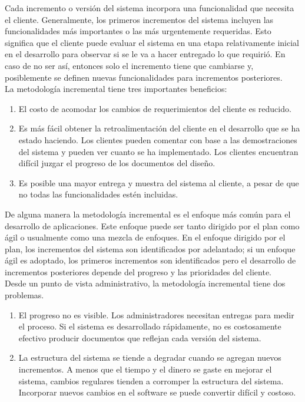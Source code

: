\documentclass[12pt]{report}
\begin{document}
Cada incremento o versión del sistema incorpora una funcionalidad que necesita el cliente. Generalmente, los primeros incrementos del sistema incluyen las funcionalidades más importantes o las más urgentemente requeridas. Esto significa que el cliente puede evaluar el sistema en una etapa relativamente inicial en el desarrollo para observar si se le va a hacer entregado lo que requirió. En caso de no ser así, entonces solo el incremento tiene que cambiarse y, posiblemente se definen nuevas funcionalidades para incrementos posteriores.\\

La metodología incremental tiene tres importantes beneficios:
\begin{enumerate}
\item El costo de acomodar los cambios de requerimientos del cliente es reducido.
\item  Es más fácil obtener la retroalimentación del cliente en el desarrollo que se ha estado haciendo. Los clientes pueden comentar con base a las demostraciones del sistema y pueden ver cuanto se ha implementado. Los clientes encuentran difícil juzgar el progreso de los documentos del diseño.
\item Es posible una mayor entrega y muestra del sistema al cliente, a pesar de que no todas las funcionalidades estén incluidas.
\end{enumerate}

De alguna manera la metodología incremental es el enfoque más común para el desarrollo de aplicaciones. Este enfoque puede ser tanto dirigido por el plan como ágil o usualmente como una mezcla de enfoques. En el enfoque dirigido por el plan, los incrementos del sistema son identificados por adelantado; si un enfoque ágil es adoptado, los primeros incrementos son identificados pero el desarrollo de incrementos posteriores depende del progreso y las prioridades del cliente.\cite{meto}\\
Desde un punto de vista administrativo, la metodología incremental tiene dos problemas.

\begin{enumerate}
\item El progreso no es visible. Los administradores necesitan entregas para medir el proceso. Si el sistema es desarrollado rápidamente, no es costosamente efectivo producir documentos que reflejan cada versión del sistema.
\item La estructura del sistema se tiende a degradar cuando se agregan nuevos incrementos. A menos que el tiempo y el dinero se gaste en mejorar el sistema, cambios regulares tienden a corromper la estructura del sistema. Incorporar nuevos cambios en el software se puede convertir difícil y costoso.
\end{enumerate}
\end{document}
